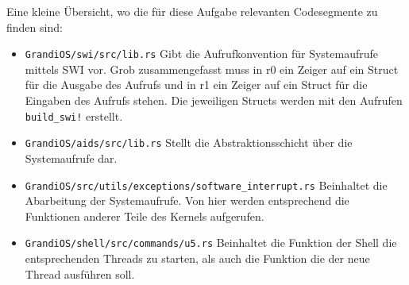 \begin{description}
Eine kleine Übersicht, wo die für diese Aufgabe relevanten Codesegmente zu finden sind:
\begin{itemize}
	\item \texttt{GrandiOS/swi/src/lib.rs} Gibt die Aufrufkonvention für Systemaufrufe mittels SWI vor. Grob zusammengefasst muss in r0 ein Zeiger auf ein Struct für die Ausgabe des Aufrufs und in r1 ein Zeiger auf ein Struct für die Eingaben des Aufrufs stehen. Die jeweiligen Structs werden mit den Aufrufen \texttt{build\_swi!} erstellt.
	\item \texttt{GrandiOS/aids/src/lib.rs} Stellt die Abstraktionsschicht über die Systemaufrufe dar.
	\item \texttt{GrandiOS/src/utils/exceptions/software\_interrupt.rs} Beinhaltet die Abarbeitung der Systemaufrufe. Von hier werden entsprechend die Funktionen anderer Teile des Kernels aufgerufen.
	\item \texttt{GrandiOS/shell/src/commands/u5.rs} Beinhaltet die Funktion der Shell die entsprechenden Threads zu starten, als auch die Funktion die der neue Thread ausführen soll.
\end{itemize}

\end{description}

